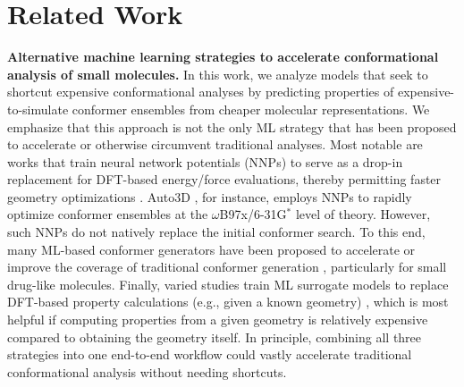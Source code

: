 \section{Related Work}
\label{relatedwork}

\textbf{Alternative machine learning strategies to accelerate conformational analysis of small molecules.}
In this work, we analyze models that seek to shortcut expensive conformational analyses by predicting properties of expensive-to-simulate conformer ensembles from cheaper molecular representations. We emphasize that this approach is not the only ML strategy that has been proposed to accelerate or otherwise circumvent traditional analyses. Most notable are works that train neural network potentials (NNPs) to serve as a drop-in replacement for DFT-based energy/force evaluations, thereby permitting faster geometry optimizations \citep{smith2017ani, zubatyuk2019accurate, anstine2024aimnet2}. Auto3D \citep{liu2022auto3d}, for instance, employs NNPs to rapidly optimize conformer ensembles at the $\omega$B97x/6-31G$^*$ level of theory. However, such NNPs do not natively replace the initial conformer search. To this end, many ML-based conformer generators have been proposed to accelerate or improve the coverage of traditional conformer generation \citep{ganea2021geomol, jing2022torsional}, particularly for small drug-like molecules. Finally, varied studies train ML surrogate models to replace DFT-based property calculations (e.g., given a known geometry) \citep{reiser2022graph}, which is most helpful if computing properties from a given geometry is relatively expensive compared to obtaining the geometry itself. In principle, combining all three strategies into one end-to-end workflow could vastly accelerate traditional conformational analysis without needing shortcuts.

